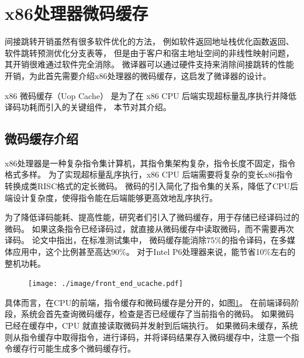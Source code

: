 \section{x86处理器微码缓存}\label{sec:complex_isa}

间接跳转开销虽然有很多软件优化的方法，
例如软件返回地址栈优化函数返回\cite{chernoffFX32Profiledirected1998}、
软件跳转预测优化分支表\cite{dantrasOptimizingIndirectBranches2016}等，
但是由于客户和宿主地址空间的非线性映射问题，其开销很难通过软件完全消除。
微译器可以通过硬件支持来消除间接跳转的性能开销，为此首先需要介绍x86处理器的微码缓存，这启发了微译器的设计。

x86 微码缓存（Uop Cache）
是为了在 x86 CPU 后端实现超标量乱序执行并降低译码功耗而引入的关键组件\cite{solomonMicrooperationCachePower2001}，
本节对其介绍。

\subsection{微码缓存介绍}

x86处理器是一种复杂指令集计算机，其指令集架构复杂，指令长度不固定，指令格式多样。
为了实现超标量乱序执行，x86 CPU 后端需要将复杂的变长x86指令转换成类RISC格式的定长微码。
微码的引入简化了指令集的关系，降低了CPU后端设计复杂度，使得指令能在后端能够更高效地乱序执行。

为了降低译码能耗、提高性能，研究者们引入了微码缓存，用于存储已经译码过的微码。
如果这条指令已经译码过，就直接从微码缓存中读取微码，而不需要再次译码。
\cite{solomonMicrooperationCachePower2001}论文中指出，在标准测试集中，
微码缓存能消除75\%的指令译码，在多媒体应用中，这个比例甚至高达90\%。
对于Intel P6处理器来说，能节省10\%左右的整机功耗。

\begin{figure}[!htbp]
  \centering
  \texttt{[image: ./image/front\_end\_ucache.pdf]}
  \label{img:front_end_ucache}
\end{figure}

具体而言，在CPU的前端，指令缓存和微码缓存是分开的，如图\ref{img:front_end_ucache}。
在前端译码阶段，系统会首先查询微码缓存，检查是否已经缓存了当前指令的微码。
如果微码已经在缓存中，CPU 就直接读取微码并发射到后端执行。
如果微码未缓存，系统则从指令缓存中取得指令，进行译码，并将译码结果存入微码缓存中，注意一个指令缓存行可能生成多个微码缓存行。

